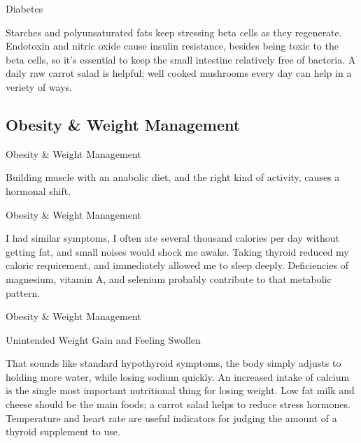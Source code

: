 \documentclass[11pt,oneside,openany,extrafontsizes]{memoir}
\begin{document}
\begin{standalonequote}{Diabetes}

    \begin{answer}
      Starches and polyunsaturated fats keep stressing beta cells as they regenerate. Endotoxin and nitric oxide cause insulin resistance, besides being toxic to the beta cells, so it's essential to keep the small intestine relatively free of bacteria. A daily raw carrot salad is helpful; well cooked mushrooms every day can help in a veriety of ways.
    \end{answer}
\end{standalonequote}

\subsection{Obesity \& Weight Management}

\begin{standalonequote}{Obesity \& Weight Management}

    \begin{answer}
        Building muscle with an anabolic diet, and the right kind of activity, causes a hormonal shift.
    \end{answer}
\end{standalonequote}

\begin{standalonequote}{Obesity \& Weight Management}

    \begin{answer}
        I had similar symptoms, I often ate several thousand calories per day without getting fat, and small noises would shock me awake. Taking thyroid reduced my caloric requirement, and immediately allowed me to sleep deeply. Deficiencies of magnesium, vitamin A, and selenium probably contribute to that metabolic pattern.
    \end{answer}
\end{standalonequote}

\begin{standalonequote}{Obesity \& Weight Management}
    \begin{note}
        Unintended Weight Gain and Feeling Swollen
    \end{note}

    \begin{answer}
        That sounds like standard hypothyroid symptoms, the body simply adjusts to holding more water, while losing sodium quickly. An increased intake of calcium is the single most important nutritional thing for losing weight. Low fat milk and cheese should be the main foods; a carrot salad helps to reduce stress hormones. Temperature and heart rate are useful indicators for judging the amount of a thyroid supplement to use.
    \end{answer}
\end{standalonequote}
\end{document}
